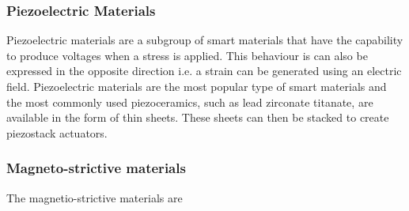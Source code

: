 \subsubsection{Piezoelectric Materials}
Piezoelectric materials are a subgroup of smart materials that have the capability to produce voltages when a stress is applied. This behaviour is can also be expressed in the opposite direction i.e. a strain can be generated using an electric field. Piezoelectric materials are the most popular type of smart materials and the most commonly used piezoceramics, such as lead zirconate titanate, are available in the form of thin sheets. These sheets can then be stacked to create piezostack actuators.

\subsubsection{Magneto-strictive materials}
The magnetio-strictive materials are
